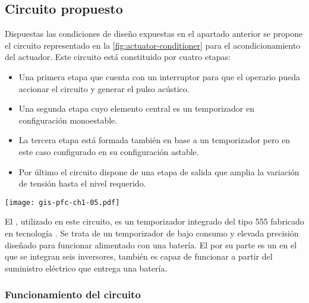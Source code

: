\subsection{Circuito propuesto}

Dispuestas las condiciones de diseño expuestas en el apartado anterior se
propone el circuito representado en la \cref{fig:actuator-conditioner} para
el acondicionamiento del actuador. Este circuito está constituido por
cuatro etapas:

\begin{itemize}
    \item Una primera etapa que cuenta con un interruptor para que el
	operario pueda accionar el circuito y generar el pulso acústico.
    \item Una segunda etapa cuyo elemento central es un temporizador en
	configuración monoestable.
    \item La tercera etapa está formada también en base a un temporizador
	pero en este caso configurado en su configuración astable.
    \item Por último el circuito dispone de una etapa de salida que amplia
	la variación de tensión hasta el nivel requerido.
\end{itemize}

\begin{sidewaysfigure}[p]
	\begin{center}
		\texttt{[image: gis-pfc-ch1-05.pdf]}
	\end{center}
	\caption[Circuito acondicionador de la sección de emisión]{Circuito
	propuesto para acondicionar el actuador de ultrasonidos. Para
	elaborar la figura se ha utilizado el  y el 
	de Texas Instruments.}
	\label{fig:actuator-conditioner}
\end{sidewaysfigure}

El , utilizado en este circuito, es un temporizador integrado
del tipo 555 fabricado en tecnología . Se trata de un
temporizador de bajo consumo y elevada precisión diseñado para funcionar
alimentado con una batería. El  por su parte es un 
en el que se integran seis inversores, también es capaz de funcionar a
partir del suministro eléctrico que entrega una batería.


\subsubsection{Funcionamiento del circuito}

